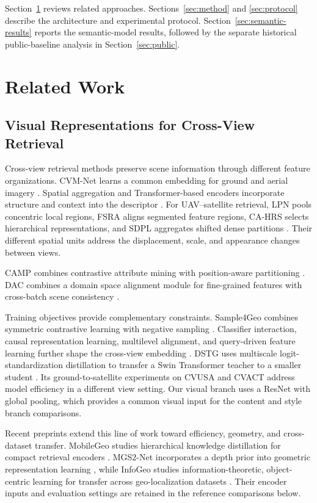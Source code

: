 \documentclass[journal]{IEEEtran}
\begin{document}
Section~\ref{sec:related} reviews related approaches.
Sections~\ref{sec:method} and \ref{sec:protocol} describe the architecture and
experimental protocol. Section~\ref{sec:semantic-results} reports the
semantic-model results, followed by the separate historical public-baseline
analysis in Section~\ref{sec:public}.

\section{Related Work}
\label{sec:related}

\subsection{Visual Representations for Cross-View Retrieval}

Cross-view retrieval methods preserve scene information through different
feature organizations. CVM-Net learns a common embedding for ground and
aerial imagery \cite{cvmnet2018}. Spatial aggregation and Transformer-based
encoders incorporate structure and context into the descriptor
\cite{safa2019,transgeo2022}. For UAV--satellite retrieval, LPN pools
concentric local regions, FSRA aligns segmented feature regions, CA-HRS
selects hierarchical representations, and SDPL aggregates shifted dense
partitions \cite{lpn2022,fsra2022,cahrs2023,sdpl2024}. Their different spatial
units address the displacement, scale, and appearance changes between
views.

CAMP combines contrastive attribute mining with position-aware partitioning
\cite{camp2024}. DAC combines a domain space alignment module for
fine-grained features with cross-batch scene consistency \cite{dac2024}.

Training objectives provide complementary constraints. Sample4Geo combines
symmetric contrastive learning with negative sampling
\cite{sample4geo2023}. Classifier interaction, causal representation
learning, multilevel alignment, and query-driven feature learning further
shape the cross-view embedding \cite{mccg2024,ccr2024,mean2025,qdfl2025}.
DSTG uses multiscale logit-standardization distillation to transfer a Swin
Transformer teacher to a smaller student \cite{dstg2025}. Its
ground-to-satellite experiments on CVUSA and CVACT address model efficiency
in a different view setting. Our visual branch uses a ResNet with global
pooling, which provides a common visual input for the content and style
branch comparisons.

Recent preprints extend this line of work toward efficiency, geometry, and
cross-dataset transfer. MobileGeo studies hierarchical knowledge
distillation for compact retrieval encoders \cite{mobilegeo2026}.
MGS2-Net incorporates a depth prior into geometric representation learning
\cite{mgs2026v2}, while InfoGeo studies information-theoretic, object-centric
learning for transfer across geo-localization datasets \cite{infogeo2026}.
Their encoder inputs and evaluation settings are retained in the reference
comparisons below.
\end{document}
